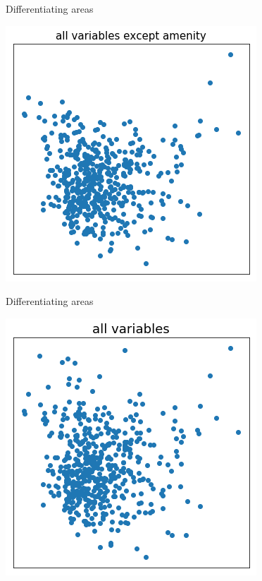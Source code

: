 \documentclass{beamer}
\begin{document}
\begin{frame}{Differentiating areas}
  \begin{center}
    \includegraphics[scale=.40]{../gfx/cluster5.png}
  \end{center}
\end{frame}

\begin{frame}{Differentiating areas}
  \begin{center}
    \includegraphics[scale=.40]{../gfx/cluster6.png}
  \end{center}
\end{frame}
\end{document}
